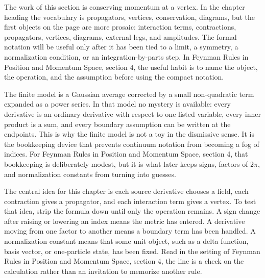 











The work of this section is conserving momentum at a vertex.  In the chapter heading the vocabulary is propagators, vertices, conservation, diagrams, but the first objects on the page are more prosaic: interaction terms, contractions, propagators, vertices, diagrams, external legs, and amplitudes.  The formal notation will be useful only after it has been tied to a limit, a symmetry, a normalization condition, or an integration-by-parts step.  In Feynman Rules in Position and Momentum Space, section 4, the useful habit is to name the object, the operation, and the assumption before using the compact notation.

The finite model is a Gaussian average corrected by a small non-quadratic term expanded as a power series.  In that model no mystery is available: every derivative is an ordinary derivative with respect to one listed variable, every inner product is a sum, and every boundary assumption can be written at the endpoints.  This is why the finite model is not a toy in the dismissive sense.  It is the bookkeeping device that prevents continuum notation from becoming a fog of indices.  For Feynman Rules in Position and Momentum Space, section 4, that bookkeeping is deliberately modest, but it is what later keeps signs, factors of \(2\pi\), and normalization constants from turning into guesses.

The central idea for this chapter is each source derivative chooses a field, each contraction gives a propagator, and each interaction term gives a vertex.  To test that idea, strip the formula down until only the operation remains.  A sign change after raising or lowering an index means the metric has entered.  A derivative moving from one factor to another means a boundary term has been handled.  A normalization constant means that some unit object, such as a delta function, basis vector, or one-particle state, has been fixed.  Read in the setting of Feynman Rules in Position and Momentum Space, section 4, the line is a check on the calculation rather than an invitation to memorize another rule.

